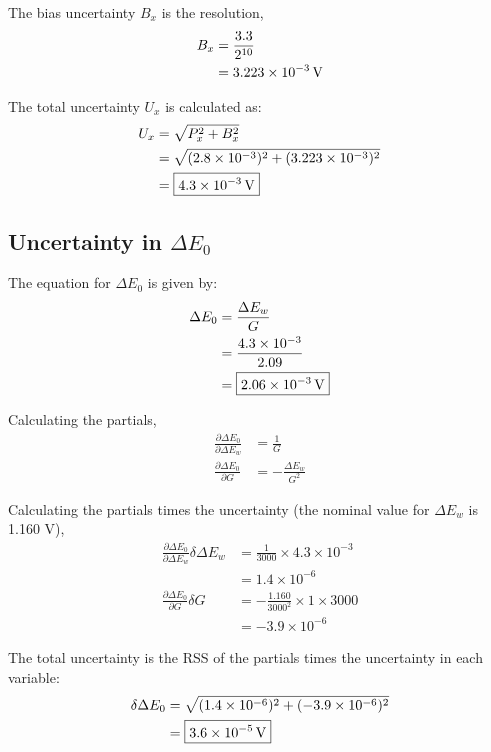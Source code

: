 The bias uncertainty $B_x$ is the resolution, 
\begin{align*}
    B_x &= \frac{3.3}{2^{10}} \\
    &= \qty{3.223E-03}{V}
\end{align*}

The total uncertainty $U_x$ is calculated as:
\begin{align*}
    U_x &= \sqrt{P_x^2 + B_x^2} \\
    &= \sqrt{(2.8\times 10^{-3})^2 + (3.223 \times 10^{-3})^2} \\
    &= \boxed{\qty{4.3E-03}{V}}
\end{align*}

\subsection{Uncertainty in $\Delta E_0$}
The equation for $\Delta E_0$ is given by:
\begin{align*}
    \Delta E_0 &= \frac{\Delta E_w}{G} \\
    &= \frac{4.3 \times 10^{-3}}{2.09} \\
    &= \boxed{\qty{2.06E-03}{V}}
\end{align*}

Calculating the partials,
\begin{align*}
    \frac{\partial \Delta E_0}{\partial \Delta E_w} &= \frac{1}{G} \\
    \frac{\partial \Delta E_0}{\partial G} &= -\frac{\Delta E_w}{G^2}
\end{align*}

Calculating the partials times the uncertainty (the nominal value for $\Delta E_w$ is 1.160 V),
\begin{align*}
    \frac{\partial \Delta E_0}{\partial \Delta E_w} \delta \Delta E_w &=  \frac{1}{3000} \times 4.3 \times 10^{-3} \\
    & = 1.4\times 10^{-6} \\
    \frac{\partial \Delta E_0}{\partial G} \delta G &=  -\frac{1.160}{3000^2} \times 1 \times 3000 \\
    & = -3.9\times 10^{-6}
\end{align*}

The total uncertainty is the RSS of the partials times the uncertainty in each variable:
\begin{align*}
    \delta \Delta E_0 &= \sqrt{(1.4\times 10^{-6})^2 + (-3.9\times 10^{-6})^2} \\
    &= \boxed{\qty{3.6E-5}{V}}
\end{align*}